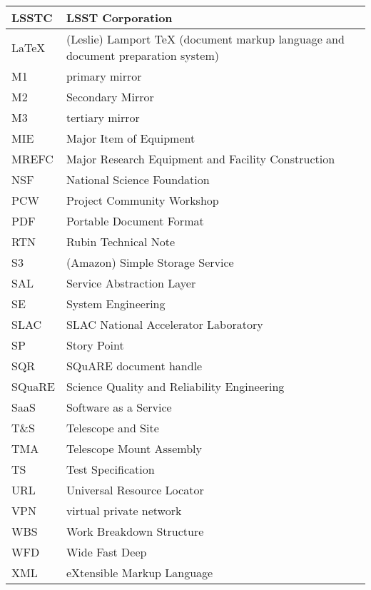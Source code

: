 \begin{longtable}{p{}p{}}
LSSTC & LSST Corporation \\\hline
LaTeX & (Leslie) Lamport TeX (document markup language and document preparation system) \\\hline
M1 & primary mirror \\\hline
M2 & Secondary Mirror \\\hline
M3 & tertiary mirror \\\hline
MIE & Major Item of Equipment \\\hline
MREFC & Major Research Equipment and Facility Construction \\\hline
NSF & National Science Foundation \\\hline
PCW & Project Community Workshop \\\hline
PDF & Portable Document Format \\\hline
RTN & Rubin Technical Note \\\hline
S3 & (Amazon) Simple Storage Service  \\\hline
SAL & Service Abstraction Layer \\\hline
SE & System Engineering \\\hline
SLAC & SLAC National Accelerator Laboratory \\\hline
SP & Story Point \\\hline
SQR & SQuARE document handle \\\hline
SQuaRE & Science Quality and Reliability Engineering \\\hline
SaaS & Software as a Service \\\hline
T\&S & Telescope and Site \\\hline
TMA & Telescope Mount Assembly \\\hline
TS & Test Specification \\\hline
URL & Universal Resource Locator \\\hline
VPN & virtual private network \\\hline
WBS & Work Breakdown Structure \\\hline
WFD & Wide Fast Deep \\\hline
XML & eXtensible Markup Language \\\hline
\end{longtable}
